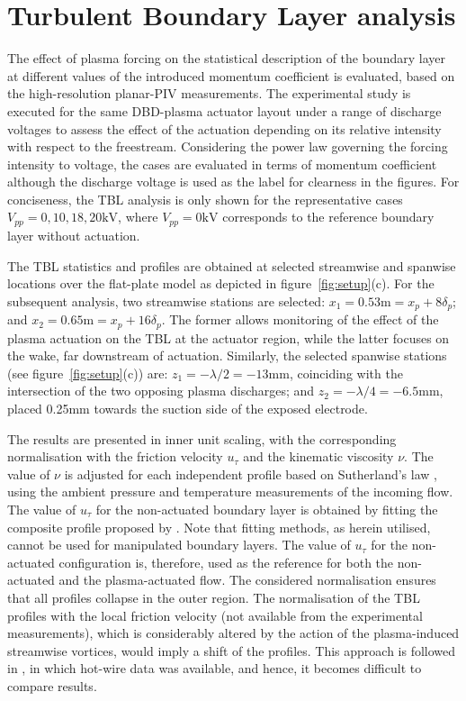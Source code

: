 \section{Turbulent Boundary Layer analysis } \label{s:TBLanalysis}
%
The effect of plasma forcing on the statistical description of the boundary layer at different values of the introduced momentum coefficient is evaluated, based on the high-resolution planar-PIV measurements. The experimental study is executed for the same DBD-plasma actuator layout under a range of discharge voltages to assess the effect of the actuation depending on its relative intensity with respect to the freestream. Considering the power law governing the forcing intensity to voltage, the cases are evaluated in terms of momentum coefficient although the discharge voltage is used as the label for clearness in the figures. For conciseness, the TBL analysis is only shown for the representative cases $V_{pp} = 0,10,18,20\mathrm{kV}$, where $V_{pp}=0\mathrm{kV}$ corresponds to the reference boundary layer without actuation.

The TBL statistics and profiles are obtained at selected streamwise and spanwise locations over the flat-plate model as depicted in figure~\ref{fig:setup}(c). For the subsequent analysis, two streamwise stations are selected: $x_1 = 0.53\mathrm{m} = {x}_p + 8\delta_p$; and $x_2 = 0.65\mathrm{m} = {x}_p + 16\delta_p$. The former allows monitoring of the effect of the plasma actuation on the TBL at the actuator region, while the latter focuses on the wake, far downstream of actuation. Similarly, the selected spanwise stations (see figure~\ref{fig:setup}(c)) are: $z_1 = -\lambda/2 =-13\mathrm{mm}$, coinciding with the intersection of the two opposing plasma discharges; and $z_2 = -\lambda/4 = -6.5\mathrm{mm}$, placed 0.25mm towards the suction side of the exposed electrode. 

The results are presented in inner unit scaling, with the corresponding normalisation with the friction velocity $u_\tau$ and the kinematic viscosity $\nu$. The value of $\nu$ is adjusted for each independent profile based on Sutherland's law \citep{Sutherland1893law}, using the ambient pressure and temperature measurements of the incoming flow. The value of $u_\tau$ for the non-actuated boundary layer is obtained by fitting the composite profile proposed by \citet{chauhan2009}. Note that fitting methods, as herein utilised, cannot be used for manipulated boundary layers. The value of $u_{\tau}$ for the non-actuated configuration is, therefore, used as the reference for both the non-actuated and the plasma-actuated flow. The considered normalisation ensures that all profiles collapse in the outer region. The normalisation of the TBL profiles with the local friction velocity (not available from the experimental measurements), which is considerably altered by the action of the plasma-induced streamwise vortices, would imply a shift of the profiles. This approach is followed in \citet{cheng_wong_hussain_schroder_zhou_2021}, in which hot-wire data was available, and hence, it becomes difficult to compare results.

